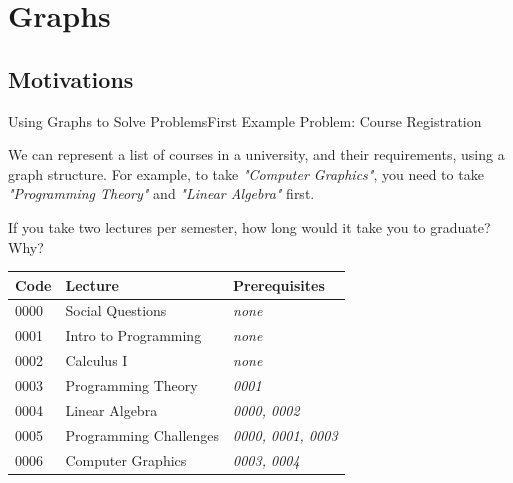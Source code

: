 \section{Graphs}


\subsection{Motivations}

\begin{frame}{Using Graphs to Solve Problems}{First Example Problem: Course Registration}

  We can represent a list of courses in a university, and their requirements, using a graph structure. For example, to take \emph{"Computer Graphics"}, you need to take \emph{"Programming Theory"} and \emph{"Linear Algebra"} first.\medskip

  If you take two lectures per semester, how long would it take you to graduate? Why?

  \begin{tabular}{p{}|p{}||p{}}
    \hline
    Code & Lecture & Prerequisites \\
    \hline
    0000 & {\small Social Questions} & \emph{none} \\
    0001 & {\small Intro to Programming} & \emph{none} \\
    0002 & {\small Calculus I} & \emph{none} \\
    0003 & {\small Programming Theory} & \emph{0001} \\
    0004 & {\small Linear Algebra} & \emph{0000, 0002} \\
    0005 & {\small Programming Challenges} & \emph{0000, 0001, 0003} \\
    0006 & {\small Computer Graphics} & \emph{0003, 0004} \\
    \hline
  \end{tabular}
\end{frame}


